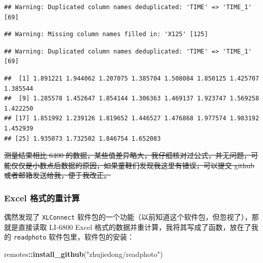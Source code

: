 \documentclass[
]{krantz}
\makeatletter
\newenvironment{Shaded}{\begin{snugshade}}{\end{snugshade}}
\newcommand{\KeywordTok}[1]{\textcolor[rgb]{0.13,0.29,0.53}{\textbf{#1}}}
\newcommand{\NormalTok}[1]{#1}
\newcommand{\OperatorTok}[1]{\textcolor[rgb]{0.81,0.36,0.00}{\textbf{#1}}}
\newcommand{\StringTok}[1]{\textcolor[rgb]{0.31,0.60,0.02}{#1}}
\newenvironment{kframe}{%
\medskip{}
\setlength{\fboxsep}{.8em}
 \def\at@end@of@kframe{}%
 \ifinner\ifhmode%
  \def\at@end@of@kframe{\end{minipage}}%
  \begin{minipage}{\columnwidth}%
 \fi\fi%
 \def\FrameCommand##1{\hskip\@totalleftmargin \hskip-\fboxsep
 \colorbox{shadecolor}{##1}\hskip-\fboxsep
     \hskip-\linewidth \hskip-\@totalleftmargin \hskip\columnwidth}%
 \MakeFramed {\advance\hsize-\width
   \@totalleftmargin\z@ \linewidth\hsize
   \@setminipage}}%
 {\par\unskip\endMakeFramed%
 \at@end@of@kframe}
\renewenvironment{Shaded}{\begin{kframe}}{\end{kframe}}
\makeatother
\begin{document}
\begin{verbatim}
## Warning: Duplicated column names deduplicated: 'TIME' => 'TIME_1' [69]
\end{verbatim}

\begin{verbatim}
## Warning: Missing column names filled in: 'X125' [125]
\end{verbatim}

\begin{verbatim}
## Warning: Duplicated column names deduplicated: 'TIME' => 'TIME_1' [69]
\end{verbatim}

\begin{Shaded}
\end{Shaded}

\begin{verbatim}
##  [1] 1.891221 1.944062 1.207075 1.385704 1.508084 1.850125 1.425707 1.385544
##  [9] 1.285578 1.452647 1.854144 1.306363 1.469137 1.923747 1.569258 1.422250
## [17] 1.851992 1.239126 1.819652 1.446527 1.476868 1.977574 1.983192 1.452939
## [25] 1.935073 1.732502 1.846754 1.652083
\end{verbatim}

\sout{测量结果相比 6400 的数据，某些值差异略大，我仔细核对过公式，并无问题，可能仅仅是小数点后数据的原因，如果童鞋们发现我这里有错误，可以提交 github 或者邮箱发送给我，便于我改正。}

\hypertarget{excel-recompute-68}{%
\subsubsection{Excel 格式的重计算}\label{excel-recompute-68}}

偶然发现了 \texttt{XLConnect} 软件包的一个功能（以前知道这个软件包，但忽视了），那就是直接读取 LI-6800 Excel 格式的数据并重计算，我将其写成了函数，放在了我的 \texttt{readphoto} 软件包里，软件包的安装：

\begin{Shaded}
\begin{Highlighting}[]
\NormalTok{remotes}\OperatorTok{::}\KeywordTok{install\_github}\NormalTok{(}\StringTok{"zhujiedong/readphoto"}\NormalTok{)}
\end{Highlighting}
\end{Shaded}
\end{document}
